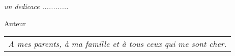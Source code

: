 \thispagestyle{empty}
\onehalfspacing
\null
\vspace{4cm}
\textit{\og{}un dedicace ............\fg{}}
\begin{flushright}
Auteur
\end{flushright}
\vspace{12cm}

\begin{large}
\begin{table*}[!h]
\begin{flushright}
\begin{tabular}{l}
\textit{A mes parents, à ma famille et à tous ceux qui me sont cher.}\\
\end{tabular}
\end{flushright}
\end{table*}
\end{large}